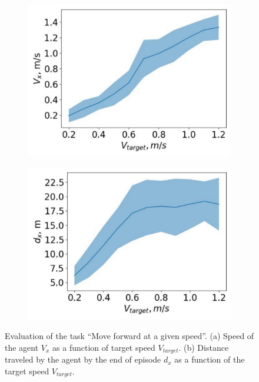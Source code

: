 \begin{figure}[ht]
\begin{subfigure}{.5\textwidth}
  \centering
  \includegraphics[width=1\textwidth]{images/vx}
\end{subfigure}%
\begin{subfigure}{.5\textwidth}
  \centering
  \includegraphics[width=1\textwidth]{images/dx}
\end{subfigure}%
\caption{Evaluation of the task ``Move forward at a given speed''. (a) Speed of the agent $V_x$ as a function of target speed $V_{target}$. (b) Distance traveled by the agent by the end of episode $d_x$ as a function of the target speed $V_{target}$.}
\label{fig:unitree_eval_forward}
\end{figure}

